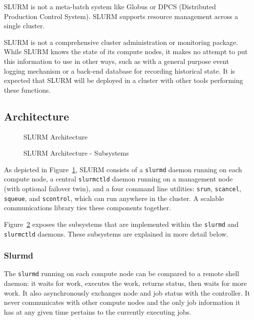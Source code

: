 SLURM is not a meta-batch system like Globus or DPCS (Distributed Production 
Control System).  SLURM supports resource management across a single cluster.

SLURM is not a comprehensive cluster administration or monitoring package.  
While SLURM knows the state of its compute nodes, it makes no attempt to put
this information to use in other ways, such as with a general purpose event
logging mechanism or a back-end database for recording historical state.
It is expected that SLURM will be deployed in a cluster with other 
tools performing these functions. 

\subsection{Architecture}

\begin{figure}[htb]
\centerline{}
\caption{SLURM Architecture}
\label{arch}
\end{figure}

\begin{figure}[htb]
\centerline{}
\caption{SLURM Architecture - Subsystems}
\label{archdetail}
\end{figure}


As depicted in Figure~\ref{arch}, SLURM consists of a {\tt slurmd} daemon
running on each compute node, a central {\tt slurmctld} daemon running on
a management node (with optional failover twin), and a four command line
utilities: {\tt srun}, {\tt scancel}, {\tt squeue}, and {\tt scontrol},
which can run anywhere in the cluster.  A scalable communications library
ties these components together.

Figure~\ref{archdetail} exposes the subsystems that are implemented
within the {\tt slurmd} and {\tt slurmctld} daemons.  These subsystems
are explained in more detail below.

\subsubsection{Slurmd}

The {\tt slurmd} running on each compute node can be compared to a remote
shell daemon:  it waits for work, executes the work, returns status,
then waits for more work.  It also asynchronously exchanges node and job
status with the controller.  It never communicates with other compute
nodes and the only job information it has at any given time pertains to
the currently executing jobs.

